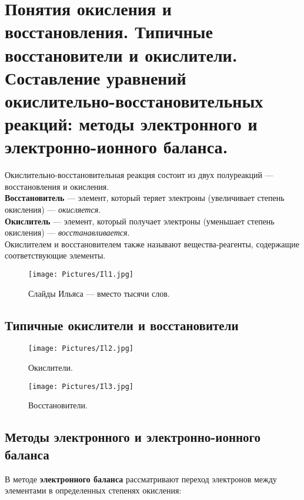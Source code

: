 
\section{Понятия окисления и восстановления. Типичные восстановители и окислители. Составление уравнений окислительно-восстановительных реакций: методы электронного и электронно-ионного баланса.}

Окислительно-восстановительная реакция состоит из двух полуреакций --- восстановления и окисления.\\

\textbf{Восстановитель} --- элемент, который теряет электроны (увеличивает степень окисления) --- \textit{окисляется}.\\

\textbf{Окислитель} --- элемент, который получает электроны (уменьшает степень окисления) --- \textit{восстанавливается}.\\

Окислителем и восстановителем также называют вещества-реагенты, содержащие соответствующие элементы.

\begin{figure}[H]
	\centering
	\texttt{[image: Pictures/Il1.jpg]}
	\caption{Слайды Ильяса --- вместо тысячи слов.}
	\label{fig:Il1}
\end{figure}

\subsection{Типичные окислители и восстановители}

\begin{figure}[H]
	\centering
	\texttt{[image: Pictures/Il2.jpg]}
	\caption{Окислители.}
\end{figure}
\begin{figure}[H]
	\centering
	\texttt{[image: Pictures/Il3.jpg]}
	\caption{Восстановители.}
\end{figure}

\subsection{Методы электронного и электронно-ионного баланса}

В методе \textbf{электронного баланса} рассматривают переход электронов между элементами в определенных степенях окисления:

